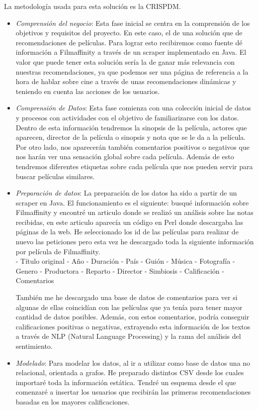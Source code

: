 \documentclass[12pt,a4paper]{article}
\begin{document}
			La metodología usada para esta solución es la CRISPDM.
			\begin{itemize}
			\item \textit{Comprensión del negocio}: 			
			Esta fase inicial se centra en la comprensión de los objetivos y requisitos del proyecto. En este caso, el de una solución que de recomendaciones de películas. Para lograr esto recibiremos como fuente dé información a Filmaffinity a través de un scraper implementado en Java. El valor que puede tener esta solución sería la de ganar más relevancia con nuestras recomendaciones, ya que podemos ser una página de referencia a la hora de hablar sobre cine a través de unas recomendaciones dinámicas y teniendo en cuenta las acciones de los usuarios.
			\item \textit{Comprensión de Datos}: 
			Esta fase comienza con una colección inicial de datos y procesos con actividades con el objetivo de familiarizarse con los datos. Dentro de esta información tendremos la sinopsis de la película, actores que aparecen, director de la película o sinopsis y nota que se le da a la película. Por otro lado, nos aparecerán también comentarios positivos o negativos que nos harán ver una sensación global sobre cada película. Además de esto tendremos diferentes etiquetas sobre cada película que nos pueden servir para buscar películas similares.
			\item \textit{Preparación de datos}: 
			La preparación de los datos ha sido a partir de un scraper en Java. El funcionamiento es el siguiente: busqué información sobre Filmaffinity y encontré un articulo donde se realizó un análisis sobre las notas recibidas, en este articulo aparecía un código en Perl donde descargaba las páginas de la web. He seleccionado los id de las películas para realizar de nuevo las peticiones pero esta vez he descargado toda la siguiente información por película de Filmaffinity.\\
			
			\subitem - Título original
			\subitem - Año
			\subitem - Duración
			\subitem - País
			\subitem - Guión
			\subitem - Música
			\subitem - Fotografía
			\subitem - Genero
			\subitem - Productora
			\subitem - Reparto
			\subitem - Director
			\subitem - Simbiosis
			\subitem - Calificación
			\subitem - Comentarios
			
			También me he descargado una base de datos de comentarios para ver si algunas de ellas coincidían con las películas que ya tenía para tener mayor cantidad de datos posibles.
			Además, con estos comentarios, podría conseguir calificaciones positivas o negativas, extrayendo esta información de los textos a través de NLP (Natural Language Processing) y la rama del análisis del sentimiento.
			\item \textit{Modelado}: 
			Para modelar los datos, al ir a utilizar como base de datos una no relacional, orientada a grafos. He preparado distintos CSV desde los cuales importaré toda la información estática. Tendré un esquema desde el que comenzaré a insertar los usuarios que recibirán las primeras recomendaciones basadas en los mayores calificaciones.
			

\end{itemize}
\end{document}
